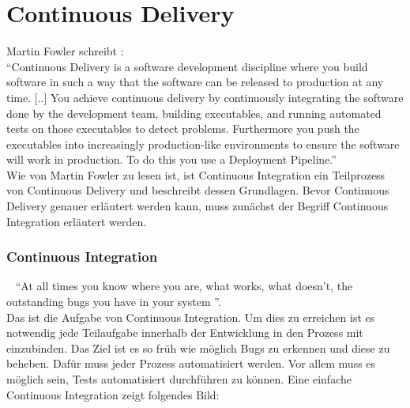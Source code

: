 \chapter{Continuous Delivery}
\label{chap:continuousDelivery}
Martin Fowler schreibt \cite{Fowler:CD}:
\\
"`Continuous Delivery is a software development discipline where you build software in such a way that the software can be released to production at any time. [..] You achieve continuous delivery by continuously integrating the software done by the development team, building executables, and running automated tests on those executables to detect problems. Furthermore you push the executables into increasingly production-like environments to ensure the software will work in production. To do this you use a Deployment Pipeline."' 
\\
Wie von Martin Fowler zu lesen ist, ist Continuous Integration ein Teilprozess von Continuous Delivery und beschreibt dessen Grundlagen. Bevor Continuous Delivery genauer erläutert werden kann, muss zunächst der Begriff Continuous Integration erläutert werden.

\subsection{Continuous Integration}\
\label{subsec:ContinuousIntegration}
"`At all times you know where you are, what works, what doesn't, the outstanding bugs you have in your system "'\cite{Fowler:CI}. 
\\
Das ist die Aufgabe von Continuous Integration. Um dies zu erreichen ist es notwendig jede Teilaufgabe innerhalb der Entwicklung in den Prozess mit einzubinden. Das Ziel ist es so früh wie möglich Bugs zu erkennen und diese zu beheben. Dafür muss jeder Prozess automatisiert werden. Vor allem muss es möglich sein, Tests automatisiert durchführen zu können. Eine einfache Continuous Integration zeigt folgendes Bild:

